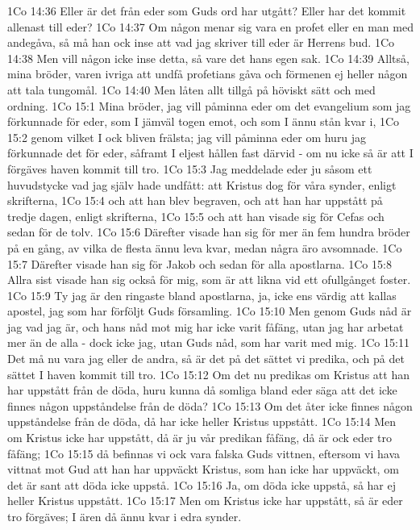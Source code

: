 1Co 14:36  Eller är det från eder som Guds ord har utgått? Eller har det kommit allenast till eder?
1Co 14:37  Om någon menar sig vara en profet eller en man med andegåva, så må han ock inse att vad jag skriver till eder är Herrens bud.
1Co 14:38  Men vill någon icke inse detta, så vare det hans egen sak.
1Co 14:39  Alltså, mina bröder, varen ivriga att undfå profetians gåva och förmenen ej heller någon att tala tungomål.
1Co 14:40  Men låten allt tillgå på höviskt sätt och med ordning.
1Co 15:1  Mina bröder, jag vill påminna eder om det evangelium som jag förkunnade för eder, som I jämväl togen emot, och som I ännu stån kvar i,
1Co 15:2  genom vilket I ock bliven frälsta; jag vill påminna eder om huru jag förkunnade det för eder, såframt I eljest hållen fast därvid - om nu icke så är att I förgäves haven kommit till tro.
1Co 15:3  Jag meddelade eder ju såsom ett huvudstycke vad jag själv hade undfått: att Kristus dog för våra synder, enligt skrifterna,
1Co 15:4  och att han blev begraven, och att han har uppstått på tredje dagen, enligt skrifterna,
1Co 15:5  och att han visade sig för Cefas och sedan för de tolv.
1Co 15:6  Därefter visade han sig för mer än fem hundra bröder på en gång, av vilka de flesta ännu leva kvar, medan några äro avsomnade.
1Co 15:7  Därefter visade han sig för Jakob och sedan för alla apostlarna.
1Co 15:8  Allra sist visade han sig också för mig, som är att likna vid ett ofullgånget foster.
1Co 15:9  Ty jag är den ringaste bland apostlarna, ja, icke ens värdig att kallas apostel, jag som har förföljt Guds församling.
1Co 15:10  Men genom Guds nåd är jag vad jag är, och hans nåd mot mig har icke varit fåfäng, utan jag har arbetat mer än de alla - dock icke jag, utan Guds nåd, som har varit med mig.
1Co 15:11  Det må nu vara jag eller de andra, så är det på det sättet vi predika, och på det sättet I haven kommit till tro.
1Co 15:12  Om det nu predikas om Kristus att han har uppstått från de döda, huru kunna då somliga bland eder säga att det icke finnes någon uppståndelse från de döda?
1Co 15:13  Om det åter icke finnes någon uppståndelse från de döda, då har icke heller Kristus uppstått.
1Co 15:14  Men om Kristus icke har uppstått, då är ju vår predikan fåfäng, då är ock eder tro fåfäng;
1Co 15:15  då befinnas vi ock vara falska Guds vittnen, eftersom vi hava vittnat mot Gud att han har uppväckt Kristus, som han icke har uppväckt, om det är sant att döda icke uppstå.
1Co 15:16  Ja, om döda icke uppstå, så har ej heller Kristus uppstått.
1Co 15:17  Men om Kristus icke har uppstått, så är eder tro förgäves; I ären då ännu kvar i edra synder.
